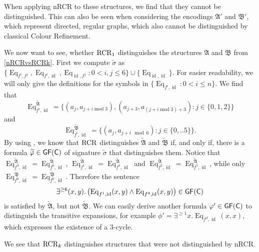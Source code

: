 When applying nRCR to these structures, we find that they cannot be distinguished.
This can also be seen when considering the encodings $\mathfrak A'$ and $\mathfrak B'$, which represent directed, regular graphs, which also cannot be distinguished by classical Colour Refinement.

We now want to see, whether $\operatorname{RCR}_1$ distinguishes the structures $\mathfrak A$ and $\mathfrak B$ from \cref{nRCRvsRCRk}.
First we compute $\widetilde\sigma$ as $\{\operatorname{Eq}_{f^i,f^j}, \operatorname{Eq}_{f^i,\operatorname{id}}, \operatorname{Eq}_{\operatorname{id},f^j} : 0< i,j \leq 6\}\cup\{\operatorname{Eq}_{\operatorname{id},\operatorname{id}}\}$. 
For easier readability, we will only give the definitions for the symbols in $\{\operatorname{Eq}_{f^i,\operatorname{id}} : 0 < i \leq n\}$. 
We find that 
$$\operatorname{Eq}_{f^i,\operatorname{id}}^{\widetilde{\mathfrak A}} = \{(a_j,a_{j+i \operatorname{mod} 3}),(a_{j+3}, a_{(j+i\operatorname{mod} 3)+3}) : j \in \{0,1,2\}\}$$
and 
$$\operatorname{Eq}_{f^i,\operatorname{id}}^{\widetilde{\mathfrak B}} = \{(a_j,a_{j+i \mod 6}) : j \in \{0,..5\}\}.$$
By using \cite{scheidt2025ColorRefinement}, we know that $\operatorname{RCR}$ distinguishes $\widetilde{\mathfrak A}$ and $\widetilde{\mathfrak B}$ if, and only if, there is a formula $\widetilde{\varphi}\in\mathsf{GF}(\mathsf{C})$ of signature $\widetilde{\sigma}$ that distinguishes them.
Notice that $\operatorname{Eq}_{f^3,\operatorname{id}}^{\widetilde{\mathfrak A}}=\operatorname{Eq}_{f^6,\operatorname{id}}^{\widetilde{\mathfrak A}}$, $\operatorname{Eq}_{f^1,\operatorname{id}}^{\widetilde{\mathfrak A}}=\operatorname{Eq}_{f^4,\operatorname{id}}^{\widetilde{\mathfrak A}}$ and $\operatorname{Eq}_{f^2,\operatorname{id}}^{\widetilde{\mathfrak A}}=\operatorname{Eq}_{f^5,\operatorname{id}}^{\widetilde{\mathfrak A}}$, while only $\operatorname{Eq}_{f^0,\operatorname{id}}^{\widetilde{\mathfrak B}}=\operatorname{Eq}_{f^6,\operatorname{id}}^{\widetilde{\mathfrak B}}$.
Therefore the sentence 
$$\exists^{\geq 6}(x,y).\left(\operatorname{Eq}_{f^1,\operatorname{id}}(x,y) \land \operatorname{Eq}_{f^4,\operatorname{id}}(x,y)\right)\in \mathsf{GF}(\mathsf{C})$$ 
is satisfied by $\widetilde{\mathfrak A}$, but not $\widetilde{\mathfrak B}$.
We can easily derive another formula $\varphi'\in \mathsf{GF}(\mathsf{C})$ to distinguish the transitive expansions, for example $\phi'=\exists^{\geq 1} x. \operatorname{Eq}_{f^3, \operatorname{id}}(x, x)$, which expresses the existence of a $3$-cycle.

We see that $\operatorname{RCR}_k$ distinguishes structures that were not distinguished by nRCR.


